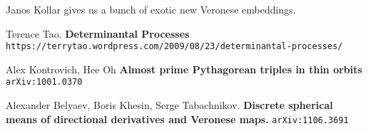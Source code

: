 \documentclass[12pt]{article}
\begin{document}
Janos Kollar gives us a bunch of exotic new Veronese embeddings.  

\newpage

\selectfont \fontsize{12}{10}\selectfont

\begin{thebibliography}{}


\item Terence Tao.  \textbf{Determinantal Processes} \\ \texttt{https://terrytao.wordpress.com/2009/08/23/determinantal-processes/}

\item Alex Kontrovich, Hee Oh \textbf{
Almost prime Pythagorean triples in thin orbits}
\texttt{arXiv:1001.0370}


\item Alexander Belyaev, Boris Khesin, Serge Tabachnikov. \textbf{Discrete spherical means of directional derivatives and Veronese maps.}
\texttt{arXiv:1106.3691}

\end{thebibliography}
\end{document}
